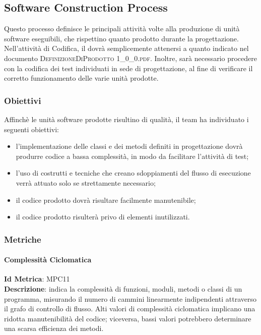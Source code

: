 			
	\subsection{Software Construction Process}
	Questo processo definisce le principali attività volte alla produzione di unità software eseguibili, che
	rispettino quanto prodotto durante la progettazione.
	Nell’attività di Codifica, il \textit{\Progr} dovrà semplicemente attenersi a quanto indicato nel documento \textsc{DefinizioneDiProdotto 1\_0\_0.pdf}. Inoltre, sarà necessario procedere con la codifica dei test individuati in sede di progettazione, al fine di verificare il corretto funzionamento delle varie unità prodotte.
		
		\subsubsection{Obiettivi}
		Affinchè le unità software prodotte risultino di qualità, il team ha individuato i seguenti obiettivi:
		\begin{itemize}
			\item l’implementazione delle classi e dei metodi definiti in progettazione dovrà produrre codice a bassa complessità, in modo da facilitare l'attività di test;
			\item l’uso di costrutti e tecniche che creano sdoppiamenti del flusso di esecuzione verrà attuato solo se strettamente necessario;
			\item il codice prodotto dovrà risultare facilmente manutenibile;
			\item il codice prodotto risulterà privo di elementi inutilizzati.
		\end{itemize}
		
		\subsubsection{Metriche}
			
			\paragraph{Complessità Ciclomatica}
			\textbf{Id Metrica}: \hypertarget{MPC11}{MPC11}\\
			\textbf{Descrizione}: indica la complessità di funzioni, moduli, metodi o classi di un programma, misurando il numero
			di cammini linearmente indipendenti attraverso il grafo di controllo di flusso. Alti valori di complessità ciclomatica implicano una ridotta manutenibilità del codice; viceversa, bassi valori potrebbero determinare una scarsa efficienza dei metodi.
			
